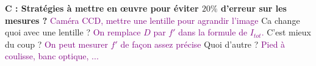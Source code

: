 \documentclass[french, a4paper, 10pt, twocolumn, landscape]{article}
\begin{document}
{  \textbf{C : Stratégies à mettre en \oe uvre pour éviter $20\%$ d'erreur sur les mesures ?} \textcolor{purple}{Caméra CCD, mettre une lentille pour agrandir l'image} Ca change quoi avec une lentille ? \textcolor{purple}{On remplace $D$ par $f'$ dans la formule de $I_{tot}$.} C'est mieux du coup ? \textcolor{purple}{On peut mesurer $f'$ de façon assez précise} Quoi d'autre ? \textcolor{purple}{Pied à coulisse, banc optique, ...}\\
  

}
\end{document}
